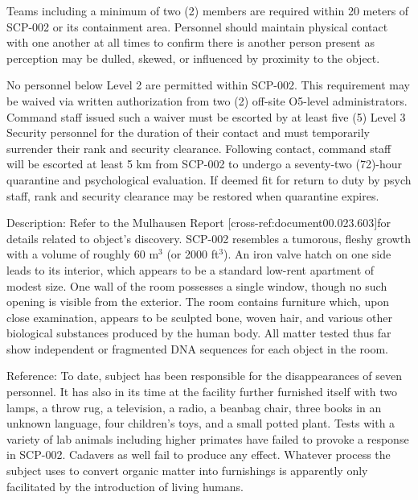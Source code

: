 \documentclass[a4paper, 11pt]{article}
\newcommand{\lb}{\ensuremath{[}}
\newcommand{\rb}{\ensuremath{]}}
\begin{document}
Teams including a minimum of two (2) members are required within 20 meters of SCP-002 or its containment area. Personnel should maintain physical contact with one another at all times to confirm there is another person present as perception may be dulled, skewed, or influenced by proximity to the object.

No personnel below Level 2 are permitted within SCP-002. This requirement may be waived via written authorization from two (2) off-site O5-level administrators. Command staff issued such a waiver must be escorted by at least five (5) Level 3 Security personnel for the duration of their contact and must temporarily surrender their rank and security clearance. Following contact, command staff will be escorted at least 5 km from SCP-002 to undergo a seventy-two (72)-hour quarantine and psychological evaluation. If deemed fit for return to duty by psych staff, rank and security clearance may be restored when quarantine expires.

Description: Refer to the Mulhausen Report \lb cross-ref:\linebreak document00.023.603\rb for details related to object's discovery. SCP-002 resembles a tumorous, fleshy growth with a volume of roughly 60 m$^3$ (or 2000 ft$^3$). An iron valve hatch on one side leads to its interior, which appears to be a standard low-rent apartment of modest size. One wall of the room possesses a single window, though no such opening is visible from the exterior. The room contains furniture which, upon close examination, appears to be sculpted bone, woven hair, and various other biological substances produced by the human body. All matter tested thus far show independent or fragmented DNA sequences for each object in the room.

Reference: To date, subject has been responsible for the disappearances of seven personnel. It has also in its time at the facility further furnished itself with two lamps, a throw rug, a television, a radio, a beanbag chair, three books in an unknown language, four children's toys, and a small potted plant. Tests with a variety of lab animals including higher primates have failed to provoke a response in SCP-002. Cadavers as well fail to produce any effect. Whatever process the subject uses to convert organic matter into furnishings is apparently only facilitated by the introduction of living humans.
\end{document}
